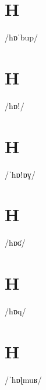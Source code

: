 \documentclass[10pt,a4paper,twoside]{book}
\begin{document}
\section*{H}

\begin{multicols}{3}
 {/hɒˈbup/} {}
\end{multicols}

\section*{H}

\begin{multicols}{3}
 {/hɒǃ/} {}
\end{multicols}

\section*{H}

\begin{multicols}{3}
 {/ˈhɒǃɒɣ/} {}
\end{multicols}

\section*{H}

\begin{multicols}{3}
 {/hɒʛ/} {}
\end{multicols}

\section*{H}

\begin{multicols}{3}
 {/hɒq/} {}
\end{multicols}

\section*{H}

\begin{multicols}{3}
 {/ˈhɒɭmuʁ/} {}
\end{multicols}
\end{document}
